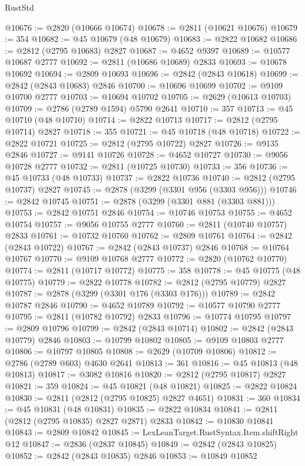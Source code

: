 \begin{lexlean}{RustStd}
\begin{coremodule}
{\begin{coremodule}
{{{{{{{{{{{{{{{{{{{{{{{{{{{{{{{{{@10676 := @2820 (@10666 @10674)
@10678 := @2811 (@10621 @10676)
@10679 := 354
@10682 := @45 @10679 (@48 @10679)
@10683 := @2822 @10682
@10686 := @2812 (@2795 @10683) @2827
@10687 := @4652 @9397
@10689 := @10577 @10687 @2777
@10692 := @2811 (@10686 @10689) @2833
@10693 := @10678 @10692
@10694 := @2809 @10693
@10696 := @2842 (@2843 @10618)
@10699 := @2842 (@2843 @10683) @2846
@10700 := @10696 @10699
@10702 := @9109 @10700 @2777
@10703 := @10694 @10702
@10705 := @2629 (@10613 @10703)
@10709 := @2786 (@2789 @1594) @5790 @2641
@10710 := 357
@10713 := @45 @10710 (@48 @10710)
@10714 := @2822 @10713
@10717 := @2812 (@2795 @10714) @2827
@10718 := 355
@10721 := @45 @10718 (@48 @10718)
@10722 := @2822 @10721
@10725 := @2812 (@2795 @10722) @2827
@10726 := @9135 @2846
@10727 := @9141 @10726
@10728 := @4652 @10727
@10730 := @9056 @10728 @2777
@10732 := @2811 (@10725 @10730)
@10733 := 356
@10736 := @45 @10733 (@48 @10733)
@10737 := @2822 @10736
@10740 := @2812 (@2795 @10737) @2827
@10745 := @2878 (@3299 (@3301 @956 (@3303 @956)))
@10746 := @2842 @10745
@10751 := @2878 (@3299 (@3301 @881 (@3303 @881)))
@10753 := @2842 @10751 @2846
@10754 := @10746 @10753
@10755 := @4652 @10754
@10757 := @9056 @10755 @2777
@10760 := @2811 (@10740 @10757) @2833
@10761 := @10732 @10760
@10762 := @2809 @10761
@10764 := @2842 (@2843 @10722)
@10767 := @2842 (@2843 @10737) @2846
@10768 := @10764 @10767
@10770 := @9109 @10768 @2777
@10772 := @2820 (@10762 @10770)
@10774 := @2811 (@10717 @10772)
@10775 := 358
@10778 := @45 @10775 (@48 @10775)
@10779 := @2822 @10778
@10782 := @2812 (@2795 @10779) @2827
@10787 := @2878 (@3299 (@3301 @176 (@3303 @176)))
@10789 := @2842 @10787 @2846
@10790 := @4652 @10789
@10792 := @10577 @10790 @2777
@10795 := @2811 (@10782 @10792) @2833
@10796 := @10774 @10795
@10797 := @2809 @10796
@10799 := @2842 (@2843 @10714)
@10802 := @2842 (@2843 @10779) @2846
@10803 := @10799 @10802
@10805 := @9109 @10803 @2777
@10806 := @10797 @10805
@10808 := @2629 (@10709 @10806)
@10812 := @2786 (@2789 @603) @4630 @2641
@10813 := 361
@10816 := @45 @10813 (@48 @10813)
@10817 := @3082 @10816
@10820 := @2812 (@2795 @10817) @2827
@10821 := 359
@10824 := @45 @10821 (@48 @10821)
@10825 := @2822 @10824
@10830 := @2811 (@2812 (@2795 @10825) @2827 @4651)
@10831 := 360
@10834 := @45 @10831 (@48 @10831)
@10835 := @2822 @10834
@10841 := @2811 (@2812 (@2795 @10835) @2827 @2871) @2833
@10842 := @10830 @10841
@10843 := @2809 @10842
@10845 := LexLeanTarget.RustSyntax.Item.shiftRight @12
@10847 := @2836 (@2837 @10845)
@10849 := @2842 (@2843 @10825)
@10852 := @2842 (@2843 @10835) @2846
@10853 := @10849 @10852
}}}}}}}}}}}}}}}}}}}}}}}}}}}}}}}}}
\end{coremodule}}
\end{coremodule}
\end{lexlean}
